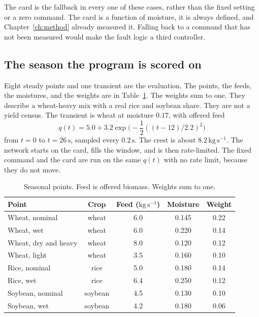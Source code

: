 The card is the fallback in every one of these cases, rather than the fixed setting or a zero command. The card is a function of moisture, it is always defined, and Chapter~\ref{ch:method} already measured it. Falling back to a command that has not been measured would make the fault logic a third controller.

\subsection{The season the program is scored on}

Eight steady points and one transient are the evaluation. The points, the feeds, the moistures, and the weights are in Table~\ref{tab:points}. The weights sum to one. They describe a wheat-heavy mix with a real rice and soybean share. They are not a yield census. The transient is wheat at moisture \(0.17\), with offered feed
\begin{equation}
q(t) = 5.0 + 3.2\exp\!\big(-{\textstyle\frac12}((t-12)/2.2)^2\big)
\label{eq:slug}
\end{equation}
from \(t=0\) to \(t=26\,\mathrm{s}\), sampled every \(0.2\,\mathrm{s}\). The crest is about \(8.2\,\mathrm{kg\,s^{-1}}\). The network starts on the card, fills the window, and is then rate-limited. The fixed command and the card are run on the same \(q(t)\) with no rate limit, because they do not move.

\begin{table}[ht]
\centering
\caption{Seasonal points. Feed is offered biomass. Weights sum to one.}
\label{tab:points}
\begin{tabular}{@{}lcccc@{}}
\toprule
Point & Crop & Feed (\(\mathrm{kg\,s^{-1}}\)) & Moisture & Weight \\
\midrule
Wheat, nominal & wheat & 6.0 & 0.145 & 0.22 \\
Wheat, wet & wheat & 6.0 & 0.220 & 0.14 \\
Wheat, dry and heavy & wheat & 8.0 & 0.120 & 0.12 \\
Wheat, light & wheat & 3.5 & 0.160 & 0.10 \\
Rice, nominal & rice & 5.0 & 0.180 & 0.14 \\
Rice, wet & rice & 6.4 & 0.250 & 0.12 \\
Soybean, nominal & soybean & 4.5 & 0.130 & 0.10 \\
Soybean, wet & soybean & 4.2 & 0.180 & 0.06 \\
\bottomrule
\end{tabular}
\end{table}


